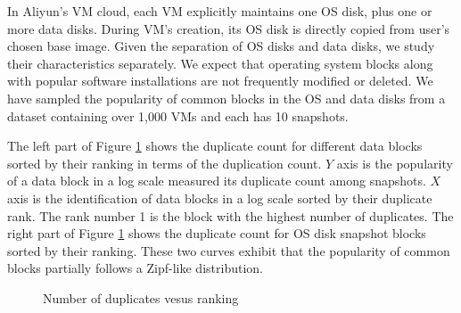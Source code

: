 In Aliyun's VM cloud, each VM explicitly maintains  one OS disk, plus one or more data disks.
During VM's creation, its OS disk is directly copied from user's chosen base image.
Given the separation of OS disks and data disks, we study  their characteristics separately.
We expect that operating system blocks along with popular software installations  are not frequently
modified or deleted. 
We have sampled  the  popularity of common blocks in the OS and data disks from a dataset
containing over 1,000 VMs and each has 10 snapshots.

The left part of Figure \ref{fig:zipf-data} shows the duplicate count for different data blocks sorted by their ranking in 
terms of the duplication count. $Y$ axis is the popularity of a data block in a log scale 
measured its duplicate count among snapshots. $X$ axis is the identification of data blocks in a log scale
sorted by their duplicate rank.  The rank number 1 is the block with the highest number of duplicates.
The right part of Figure \ref{fig:zipf-data} shows the duplicate count  for OS disk snapshot blocks sorted by their ranking.
These two curves exhibit that the popularity of common blocks partially follows a Zipf-like distribution.


\begin{figure}[htbp]
\centering
{}


\caption{Number of duplicates vesus ranking}
\label{fig:zipf-data}
\end{figure}



